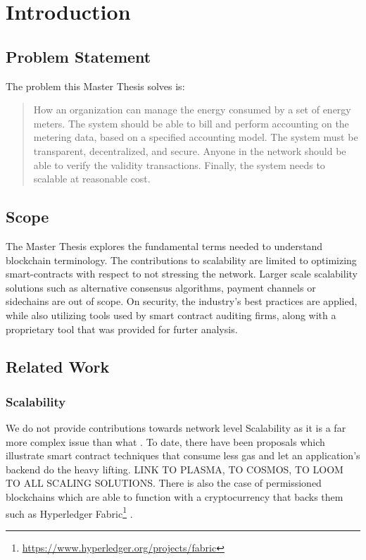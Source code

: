 \chapter{Introduction}

\section{Problem Statement}
The problem this Master Thesis solves is:

\begin{quotation}\label{problem}
How an organization can manage the energy consumed by a set of energy meters. The system should be able to bill and perform accounting on the metering data, based on a specified accounting model. The system must be transparent, decentralized, and secure. Anyone in the network should be able to verify the validity transactions. Finally, the system needs to scalable at reasonable cost.
\end{quotation}

\section{Scope}
The Master Thesis explores the fundamental terms needed to understand blockchain terminology. The contributions to scalability are limited to optimizing smart-contracts with respect to not stressing the network. Larger scale scalability solutions such as alternative consensus algorithms, payment channels or sidechains are out of scope. On security, the industry's best practices are applied, while also utilizing tools used by smart contract auditing firms, along with a proprietary tool that was provided for furter analysis.

\section{Related Work}

\subsection{Scalability}
We do not provide contributions towards network level Scalability as it is a far more complex issue than what . To date, there have been proposals \cite{stateless} which illustrate smart contract techniques that consume less gas and let an application's backend do the heavy lifting. LINK TO PLASMA, TO COSMOS, TO LOOM TO ALL SCALING SOLUTIONS. There is also the case of permissioned blockchains which are able to function with a cryptocurrency that backs them such as Hyperledger Fabric\footnote{\url{https://www.hyperledger.org/projects/fabric}} \cite{Vukolic:2017:RPB:3055518.3055526}.

